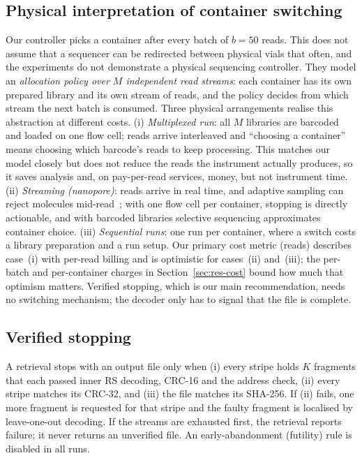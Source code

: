 \documentclass[conference,onecolumn,11pt]{IEEEtran}
\begin{document}
\subsection{Physical interpretation of container switching}
\label{sec:ops}
Our controller picks a container after every batch of $b{=}50$ reads.  This does not assume that a
sequencer can be redirected between physical vials that often, and the experiments do not demonstrate a
physical sequencing controller.  They model an \emph{allocation policy over $M$ independent read
streams}: each container has its own prepared library and its own stream of reads, and the policy
decides from which stream the next batch is consumed.  Three physical arrangements realise this
abstraction at different costs.  (i) \emph{Multiplexed run}: all $M$
libraries are barcoded and loaded on one flow cell; reads arrive interleaved and ``choosing a
container'' means choosing which barcode's reads to keep processing.  This matches our model closely
but does not reduce the reads the instrument actually produces, so it saves analysis and, on
pay-per-read services, money, but not instrument time.  (ii) \emph{Streaming (nanopore)}: reads
arrive in real time, and adaptive sampling can reject molecules mid-read~\cite{loose2016real,payne2021readfish};
with one flow cell per container, stopping is directly actionable, and with barcoded libraries
selective sequencing approximates container choice.  (iii) \emph{Sequential runs}: one run per
container, where a switch costs a library preparation and a run setup.  Our primary cost metric (reads)
describes case~(i) with per-read billing and is optimistic for cases~(ii) and~(iii); the per-batch and
per-container charges in Section~\ref{sec:res-cost} bound how much that optimism matters.  Verified
stopping, which is our main recommendation, needs no switching mechanism; the decoder only has to
signal that the file is complete.


\subsection{Verified stopping}
A retrieval stops with an output file only when (i) every stripe holds $K$ fragments that each
passed inner RS decoding, CRC-16 and the address check, (ii) every stripe matches its CRC-32, and
(iii) the file matches its SHA-256.  If (ii) fails, one more fragment is requested for that
stripe and the faulty fragment is localised by leave-one-out decoding.  If the streams are
exhausted first, the retrieval reports failure; it never returns an unverified file.  An
early-abandonment (futility) rule is disabled in all runs.
\end{document}
